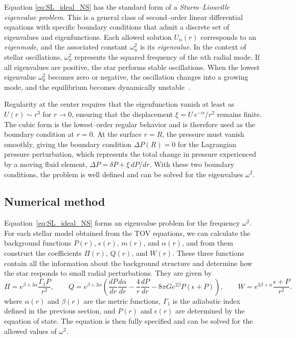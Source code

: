 Equation \eqref{eq:SL_ideal_NS} has the standard form of a \emph{Sturm--Liouville eigenvalue
problem}. This is a general class of second--order linear
differential equations with specific boundary conditions that admit a
discrete set of eigenvalues and eigenfunctions.
Each allowed solution $U_n(r)$ corresponds to an \emph{eigenmode}, and
the associated constant $\omega_n^2$ is its \emph{eigenvalue}.
In the context of stellar oscillations, $\omega_n^2$ represents the
squared frequency of the $n$th radial mode.
If all eigenvalues are positive, the star performs stable oscillations.
When the lowest eigenvalue $\omega_0^2$ becomes zero or negative, the
oscillation changes into a growing mode, and the equilibrium becomes
dynamically unstable~\cite{arfken2013}.

Regularity at the center requires that the eigenfunction vanish at least
as $U(r)\!\sim\!r^{3}$ for $r\!\to\!0$, ensuring that the 
displacement $\xi = U\,e^{-\alpha}/r^{2}$ remains finite.  The cubic
form is the lowest--order regular behavior and is therefore used as the
boundary condition at $r = 0$.  At the surface $r = R$, the pressure
must vanish smoothly, giving the boundary condition $\Delta P(R) = 0$
for the Lagrangian pressure perturbation, which represents the total
change in pressure experienced by a moving fluid element,
$\Delta P = \delta P + \xi\,dP/dr$.  With these two boundary conditions,
the problem is well defined and can be solved for the eigenvalues
$\omega^{2}$.

\subsection*{Numerical method}

Equation~\eqref{eq:SL_ideal_NS} forms an eigenvalue problem for the
frequency $\omega^2$. For each stellar model obtained from the TOV
equations, we can calculate the background functions
$P(r)$, $\epsilon(r)$, $m(r)$, and $\alpha(r)$, and from them construct
the coefficients $\Pi(r)$, $Q(r)$, and $W(r)$.
These three functions contain all the information about the background
structure and determine how the star responds to small radial perturbations.
They are given by~\cite{tooper1965}
\[
\Pi = e^{\beta+3\alpha}\frac{\Gamma_1 P}{r^2}, \qquad
Q = e^{\beta+3\alpha}\!\left(
  \frac{dP}{dr}\frac{d\alpha}{dr}
  - \frac{4}{r}\frac{dP}{dr}
  - 8\pi G e^{2\beta} P(\epsilon + P)
\right), \qquad
W = e^{3\beta+\alpha}\frac{\epsilon+P}{r^2}.
\]
where $\alpha(r)$ and $\beta(r)$ are the metric functions,
$\Gamma_1$ is the adiabatic index defined in the previous section, and
$P(r)$ and $\epsilon(r)$ are determined by the equation of state.
The equation is then fully specified and can be solved for the allowed
values of $\omega^2$.

